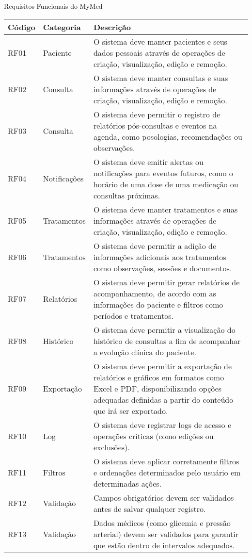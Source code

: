 \begin{quadro}
\caption{Requisitos Funcionais do MyMed}
\begin{tabularx}{\textwidth}{|l|l|X|}
\hline
\textbf{Código} & \textbf{Categoria} & \textbf{Descrição} \\ \hline
RF01 & Paciente & O sistema deve manter pacientes e seus dados pessoais através de operações de criação, visualização, edição e remoção. \\ \hline
RF02 & Consulta & O sistema deve manter consultas e suas informações através de operações de criação, visualização, edição e remoção. \\ \hline
RF03 & Consulta & O sistema deve permitir o registro de relatórios pós-consultas e eventos na agenda, como posologias, recomendações ou observações. \\ \hline
RF04 & Notificações & O sistema deve emitir alertas ou notificações para eventos futuros, como o horário de uma dose de uma medicação ou consultas próximas. \\ \hline
RF05 & Tratamentos & O sistema deve manter tratamentos e suas informações através de operações de criação, visualização, edição e remoção. \\ \hline
RF06 & Tratamentos & O sistema deve permitir a adição de informações adicionais aos tratamentos como observações, sessões e documentos. \\ \hline
RF07 & Relatórios & O sistema deve permitir gerar relatórios de acompanhamento, de acordo com as informações do paciente e filtros como períodos e tratamentos. \\ \hline
RF08 & Histórico & O sistema deve permitir a visualização do histórico de consultas a fim de acompanhar a evolução clínica do paciente. \\ \hline
RF09 & Exportação & O sistema deve permitir a exportação de relatórios e gráficos em formatos como Excel e PDF, disponibilizando opções adequadas definidas a partir do conteúdo que irá ser exportado. \\ \hline
RF10 & Log & O sistema deve registrar logs de acesso e operações críticas (como edições ou exclusões). \\ \hline
RF11 & Filtros & O sistema deve aplicar corretamente filtros e ordenações determinados pelo usuário em determinadas ações. \\ \hline
RF12 & Validação & Campos obrigatórios devem ser validados antes de salvar qualquer registro. \\ \hline
RF13 & Validação & Dados médicos (como glicemia e pressão arterial) devem ser validados para garantir que estão dentro de intervalos adequados. \\ \hline
\end{tabularx}
\end{quadro}